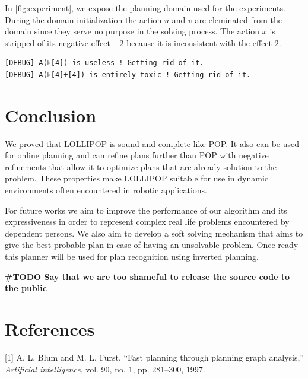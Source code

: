 In \cref{fig:experiment}, we expose the planning domain used for the
experiments. During the domain initialization the action \(u\) and \(v\)
are eleminated from the domain since they serve no purpose in the
solving process. The action \(x\) is stripped of its negative effect
\(-2\) because it is inconsistent with the effect \(2\).

\begin{minipage}{\linewidth}

\begin{lstlisting}
[DEBUG] A(⊧[4]) is useless ! Getting rid of it.
[DEBUG] A(⊧[4]+[4]) is entirely toxic ! Getting rid of it.
\end{lstlisting}

\end{minipage}

\section*{Conclusion}\label{conclusion}

We proved that LOLLIPOP is sound and complete like POP. It also can be
used for online planning and can refine plans further than POP with
negative refinements that allow it to optimize plans that are already
solution to the problem. These properties make LOLLIPOP suitable for use
in dynamic environments often encountered in robotic applications.

For future works we aim to improve the performance of our algorithm and
its expressiveness in order to represent complex real life problems
encountered by dependent persons. We also aim to develop a soft solving
mechanism that aims to give the best probable plan in case of having an
unsolvable problem. Once ready this planner will be used for plan
recognition using inverted planning.

\textbf{\#TODO Say that we are too shameful to release the source code
to the public}

\section*{References}\label{references}

\hypertarget{refs}{}
\hypertarget{ref-blumux5ffastux5f1997}{}
{[}1{]} A. L. Blum and M. L. Furst, ``Fast planning through planning
graph analysis,'' \emph{Artificial intelligence}, vol. 90, no. 1, pp.
281--300, 1997.


